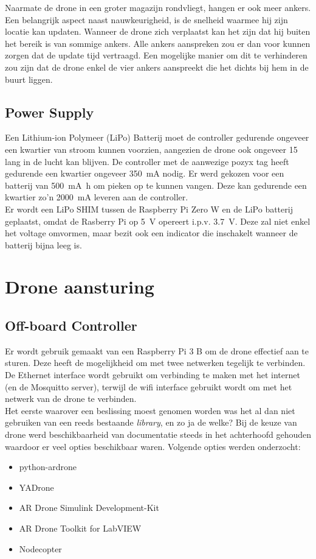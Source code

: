 Naarmate de drone in een groter magazijn rondvliegt, hangen er ook meer ankers.
Een belangrijk aspect naast nauwkeurigheid, is de snelheid waarmee hij zijn locatie kan updaten.
Wanneer de drone zich verplaatst kan het zijn dat hij buiten het bereik is van sommige ankers.
Alle ankers aanspreken zou er dan voor kunnen zorgen dat de update tijd vertraagd.
Een mogelijke manier om dit te verhinderen zou zijn dat de drone enkel de vier ankers aanspreekt die het dichts bij hem in de buurt liggen.

\subsection{Power Supply} \label{sec:power_supply}
Een Lithium-ion Polymeer (LiPo) Batterij moet de controller gedurende ongeveer een kwartier van stroom kunnen voorzien, aangezien de drone ook ongeveer \SI{15}{\min} lang in de lucht kan blijven.
De controller met de aanwezige pozyx tag heeft gedurende een kwartier ongeveer \SI{350}{\mA} nodig.
Er werd gekozen voor een batterij van \SI{500}{\mA\hour} om pieken op te kunnen vangen.
Deze kan gedurende een kwartier zo'n \SI{2000}{\mA} leveren aan de controller.\\

Er wordt een LiPo SHIM tussen de Raspberry Pi Zero W en de LiPo batterij geplaatst, omdat de Rasberry Pi op \SI{5}{\V} opereert i.p.v. \SI{3.7}{\V}.
Deze zal niet enkel het voltage omvormen, maar bezit ook een indicator die inschakelt wanneer de batterij bijna leeg is.

\section{Drone aansturing} \label{sec:drone_control}
\subsection{Off-board Controller} \label{sec:offboard_controller}
Er wordt gebruik gemaakt van een Raspberry Pi 3 B om de drone effectief aan te sturen. Deze heeft de mogelijkheid om met twee netwerken tegelijk te verbinden. De Ethernet interface wordt gebruikt om verbinding te maken met het internet (en de Mosquitto server), terwijl de wifi interface gebruikt wordt om met het netwerk van de drone te verbinden.\\

Het eerste waarover een beslissing moest genomen worden was het al dan niet gebruiken van een reeds bestaande \textit{library}, en zo ja de welke? Bij de keuze van drone werd beschikbaarheid van documentatie steeds in het achterhoofd gehouden waardoor er veel opties beschikbaar waren. Volgende opties werden onderzocht:
\begin{itemize}
\item python-ardrone
\item YADrone
\item AR Drone Simulink Development-Kit
\item AR Drone Toolkit for LabVIEW
\item Nodecopter
\end{itemize}

